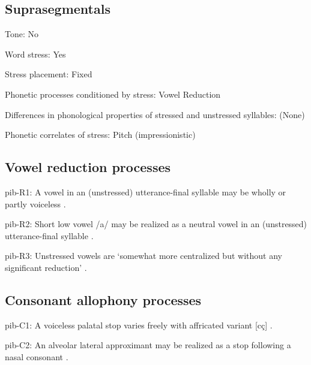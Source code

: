 {\subsection*{Suprasegmentals}
\begin{appendixdesc}
\item[Tone:] No

\item[Word stress:] Yes

\item[Stress placement:] Fixed

\item[Phonetic processes conditioned by stress:] Vowel Reduction

\item[Differences in phonological properties of stressed and unstressed syllables:] (None)

\item[Phonetic correlates of stress:] Pitch (impressionistic)
\end{appendixdesc}
\subsection*{Vowel reduction processes}
\begin{appendixdesc}

\item[pib-R1:] A vowel in an (unstressed) utterance-final syllable may be wholly or partly voiceless \citep[23]{Matteson1965}.

\item[pib-R2:] Short low vowel /a/ may be realized as a neutral vowel in an (unstressed) utterance-final syllable \citep[23]{Matteson1965}.

\item[pib-R3:] Unstressed vowels are ‘somewhat more centralized but without any significant reduction’ \citep[16]{Hanson2010}.
\end{appendixdesc}
\subsection*{Consonant allophony processes}
\begin{appendixdesc}

\item[pib-C1:] A voiceless palatal stop varies freely with affricated variant [cç] \citep[17]{Hanson2010}.

\item[pib-C2:] An alveolar lateral approximant may be realized as a stop following a nasal consonant \citep[24]{Hanson2010}.


\end{appendixdesc}}
